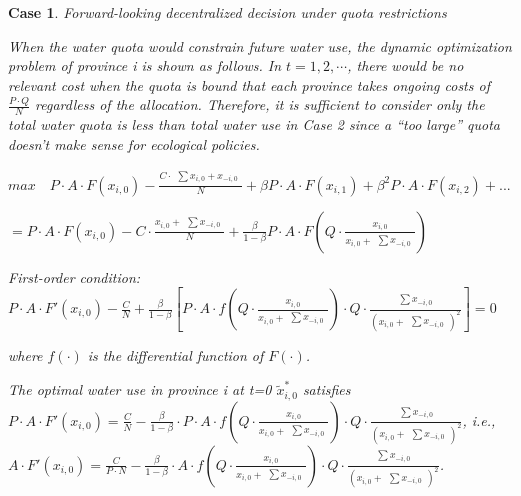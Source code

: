 \documentclass[default, sn-standardnature]{sn-jnl}
\newtheorem{case_appendix}{Case}
\begin{document}
 \begin{case_appendix}Forward-looking decentralized decision under quota restrictions

 When the water quota would constrain future water use, the dynamic optimization problem of province i is shown as follows. In $t=1,2,\cdots$, there would be no relevant cost when the quota is bound that each province takes ongoing costs of $\frac{P \cdot Q}{N}$ regardless of the allocation. Therefore, it is sufficient to consider only the total water quota is less than total water use in Case 2 since a ``too large'' quota doesn't make sense for ecological policies.

$max  \quad P \cdot A \cdot F(x_{i,0})-\frac{C \cdot \begin{matrix} \sum x_{i,0} + x_{-i,0} \end{matrix}}{N}+\beta P \cdot A \cdot F(x_{i,1})+\beta^2 P \cdot A \cdot F(x_{i,2})+...$

$=P \cdot A \cdot F(x_{i,0})-C \cdot \frac{x_{i,0} + \begin{matrix} \sum x_{-i,0} \end{matrix}}{N}+\frac{\beta}{1-\beta} P \cdot A \cdot F(Q \cdot \frac{x_{i,0}}{x_{i,0} + \begin{matrix} \sum x_{-i,0} \end{matrix}})$

First-order condition: $P \cdot A \cdot F'(x_{i,0})-\frac{C}{N}+\frac{\beta}{1-\beta}[P \cdot A \cdot f(Q \cdot \frac{x_{i,0}}{x_{i,0} + \begin{matrix} \sum x_{-i,0} \end{matrix}}) \cdot Q \cdot \frac{\begin{matrix} \sum x_{-i,0} \end{matrix}}{(x_{i,0}+\begin{matrix} \sum  x_{-i,0} \end{matrix})^2}]=0$

where $f(\cdot)$ is the differential function of $F(\cdot)$.

The optimal water use in province i at t=0 $\widetilde x_{i,0}^*$ satisfies $P \cdot A \cdot F'(x_{i,0})=\frac{C}{N}-\frac{\beta}{1-\beta} \cdot P \cdot A \cdot f(Q \cdot \frac{x_{i,0}}{x_{i,0} + \begin{matrix} \sum x_{-i,0} \end{matrix}}) \cdot Q \cdot \frac{\begin{matrix} \sum x_{-i,0} \end{matrix}}{(x_{i,0} + \begin{matrix} \sum x_{-i,0} \end{matrix})^2}$,
i.e.,
$A \cdot F'(x_{i,0})=\frac{C}{P \cdot N} - \frac{\beta}{1-\beta} \cdot A \cdot f(Q \cdot \frac{x_{i,0}}{x_{i,0} + \begin{matrix} \sum x_{-i,0} \end{matrix}}) \cdot Q \cdot \frac{\begin{matrix} \sum x_{-i,0} \end{matrix}}{(x_{i,0} + \begin{matrix} \sum x_{-i,0} \end{matrix})^2}$.


\end{case_appendix}
\end{document}
